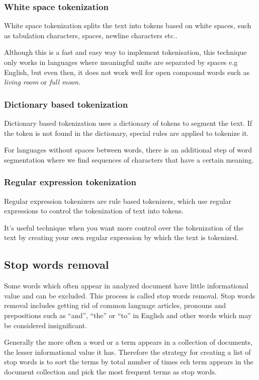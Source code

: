\subsubsection{White space tokenization}
White space tokenization splits the text into tokens based on white spaces, such as tabulation characters, spaces, newline characters etc.. 

Although this is a fast and easy way to implement tokenisation, this technique only works in languages where meaningful units are separated by spaces e.g  English, but even then, it does not work well for open compound words such as \textit{living room} or \textit{full moon}.\cite{tokenization_mgl}
\subsubsection{Dictionary based tokenization}
Dictionary based tokenization uses a dictionary of tokens to segment the text. If the token is not found in the dictionary, special rules are applied to tokenize it.\cite{tokenization_twd}

For languages without spaces between words, there is an additional step of word segmentation where we find sequences of characters that have a certain meaning.\cite{tokenization_mgl}
\subsubsection{Regular expression tokenization}
Regular expression tokenizers are rule based tokenizers, which use regular expressions to control the tokenization of text into tokens.\cite{tokenization_twd}

It's useful technique when you want more control over the tokenization of the text by creating your own regular expression by which the text is tokenized.
\subsection{Stop words removal}
Some words which often appear in analyzed document have little informational value and can be excluded. This process is called stop words removal. Stop words removal includes getting rid of common language articles, pronouns and prepositions such as “and”, “the” or “to” in English and other words which may be considered insignificant.\cite{nlp_tasks}

Generally the more often a word or a term appears in a collection of documents, the lesser informational value it has. Therefore the strategy for creating a list of stop words is to sort the terms by total number of times ech term appears in the document collection and pick the most frequent terms as stop words.\cite{stopwords}

